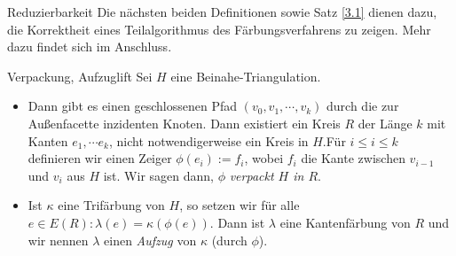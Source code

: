 \begin{section}{Reduzierbarkeit}
 Die nächsten beiden Definitionen sowie Satz \ref{3.1} dienen dazu, die Korrektheit eines Teilalgorithmus des Färbungsverfahrens zu zeigen. Mehr dazu findet sich im Anschluss.
 
 \begin{definitionl}{Verpackung, Aufzug}{lift}
  Sei $H$ eine Beinahe-Triangulation. 
  \begin{itemize}
   \item Dann gibt es einen geschlossenen Pfad $(v_0,v_1,\cdots,v_k)$ durch die zur Außenfacette inzidenten Knoten. Dann existiert ein Kreis $R$ der Länge $k$ mit Kanten $e_1,\cdots e_k$, nicht notwendigerweise ein Kreis in $H$.Für $i \leq i \leq k$ definieren wir einen Zeiger $\phi(e_i) := f_i$, wobei $f_i$ die Kante zwischen $v_{i-1}$ und $v_i$ aus $H$ ist. Wir sagen dann, $\phi$ \textit{verpackt $H$ in $R$}. 
   \item Ist $\kappa$ eine Trifärbung von $H$, so setzen wir für alle $e \in E(R): \lambda(e) = \kappa(\phi(e))$. Dann ist $\lambda$ eine Kantenfärbung von $R$ und wir nennen $\lambda$ einen \textit{Aufzug} von $\kappa$ (durch $\phi$).
  \end{itemize}
 \end{definitionl}
 

\end{section}
